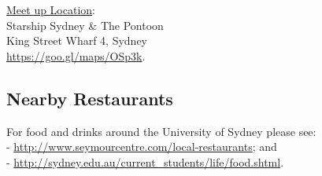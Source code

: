 \underline{Meet up Location}:  \\
Starship Sydney \& The Pontoon \\ 
King Street Wharf 4, Sydney \\
 \url{https://goo.gl/maps/OSp3k}.
%
{}
\subsection*{Nearby Restaurants}
For food and drinks around the University of Sydney please see: \\
- \url{http://www.seymourcentre.com/local-restaurants}; and \\ 
- \url{http://sydney.edu.au/current_students/life/food.shtml}.


%
%
%

